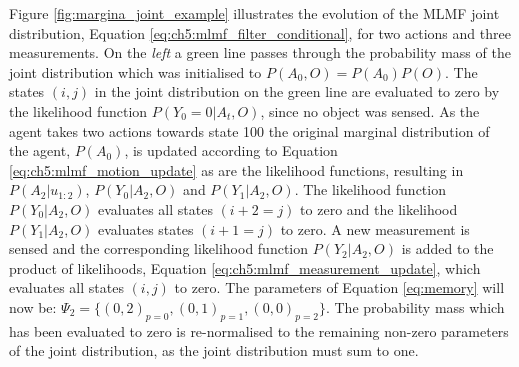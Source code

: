 Figure \ref{fig:margina_joint_example} illustrates the evolution of the MLMF joint distribution, Equation \ref{eq:ch5:mlmf_filter_conditional}, for 
two actions and three measurements. On the \textit{left} a green line passes through the probability mass of the joint distribution which was initialised to $P(A_0,O) = P(A_0) P(O)$. 
The states $(i,j)$ in the joint distribution on the green line are evaluated to zero by the likelihood function $P(Y_0=0|A_t,O)$, since no object was sensed.
As the agent takes two actions towards state 100 the original marginal distribution of the agent, $P(A_0)$, is updated according to Equation \ref{eq:ch5:mlmf_motion_update} as are the 
likelihood functions, resulting in $P(A_2|u_{1:2})$, $P(Y_0|A_2,O)$ and $P(Y_1|A_2,O)$. The likelihood function $P(Y_0|A_2,O)$ evaluates all states $(i+2=j)$ to zero and 
the likelihood $P(Y_1|A_2,O)$ evaluates states $(i+1=j)$ to zero.
A new measurement is sensed and the corresponding likelihood function
$P(Y_2|A_2,O)$ is added to the product of likelihoods, Equation \ref{eq:ch5:mlmf_measurement_update}, which evaluates all states $(i,j)$ to zero.
The parameters of Equation \ref{eq:memory} will now be: $\Psi_2 = \{(0,2)_{p=0},(0,1)_{p=1},(0,0)_{p=2}\}$. 
The probability mass which has been evaluated to zero is re-normalised to the remaining non-zero parameters of the joint distribution, 
as the joint distribution must sum to one.

